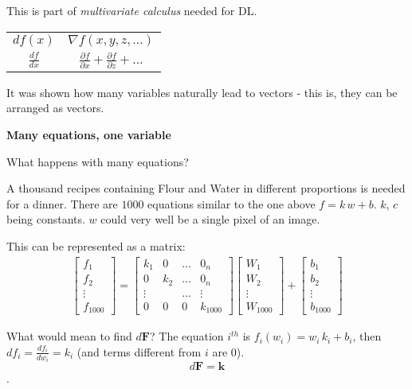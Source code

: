 This is part of \textit{multivariate calculus} needed for DL.

\begin{center}
\begin{tabular}{cc}
  $df(x)$ & $\nabla f(x,y,z,\ldots)$\\
  $\frac{df}{dx}$ & $\frac{\partial f}{\partial x}+\frac{\partial f}{\partial z}+\ldots$
\end{tabular}
\end{center}

It was shown how many variables naturally lead to vectors - this is, they can be arranged as vectors.

\textbf{Many equations, one variable}

What happens with many equations? 

A thousand recipes containing Flour and Water in different proportions is needed for a dinner. There are $1000$ equations similar to the one above $f= k\,w + b$. $k$, $c$ being constants. $w$ could very well be a single pixel of an image. 

This can be represented as a matrix:
\begin{align*}
\begin{bmatrix}
f_1\\
f_2\\
\vdots\\
  f_{1000}
\end{bmatrix}
=
\begin{bmatrix}
k_1 & 0 & \hdots & 0_n \\
0 & k_2 & \hdots & 0_n \\
\vdots & & \hdots & \vdots \\
  0 & 0 & 0 & k_{1000}
\end{bmatrix}
\begin{bmatrix}
W_1\\
W_2\\
\vdots\\
  W_{1000}
\end{bmatrix}
+
\begin{bmatrix}
b_1\\
b_2\\
\vdots\\
  b_{1000}
\end{bmatrix}
\end{align*}

What would mean to find $d\mathbf{F}$? The equation $i^{th}$ is $f_i(w_i) = w_i\,k_i + b_i$, then $df_i = \frac{df_i}{dw_i} = k_i$ (and terms different from $i$ are $0$). $$d\mathbf{F} = \mathbf{k}$$.

